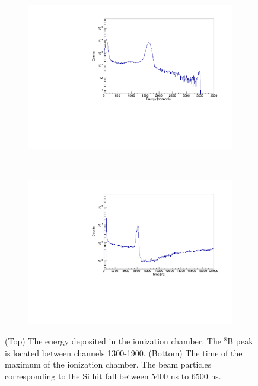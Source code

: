 \documentclass[final,number,sort&compress,5p,times,twocolumn]{elsarticle}
\begin{document}
\begin{figure}[hbt!]
	\centering
	\begin{subfigure}{.5\textwidth}
  		\centering
  		\includegraphics[width=\linewidth]{figures/9C_icE}
	\end{subfigure}%
	\\
	\begin{subfigure}{.5\textwidth}
  		\centering
  		\includegraphics[width=\linewidth]{figures/9C_icT}
	\end{subfigure}
	\caption{(Top) The energy deposited in the ionization chamber. The $^{8}$B peak is located between channels 1300-1900. (Bottom) The time of the maximum of the ionization chamber. The beam particles corresponding to the Si hit fall between 5400 ns to 6500 ns.}
	\label{fig:9CIonization}
\end{figure}
\end{document}

